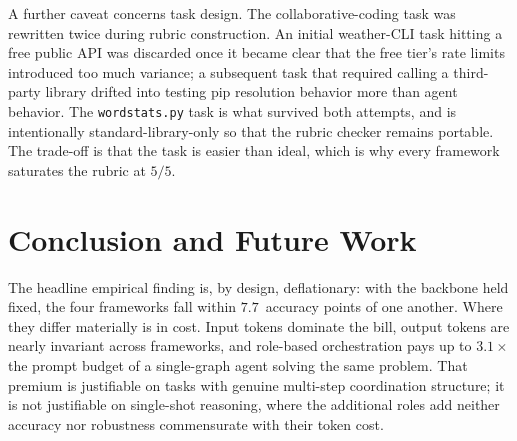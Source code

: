 \documentclass[conference]{IEEEtran}
\begin{document}
A further caveat concerns task design. The collaborative-coding task
was rewritten twice during rubric construction. An initial weather-CLI
task hitting a free public API was discarded once it became clear
that the free tier's rate limits introduced too much variance; a
subsequent task that required calling a third-party library drifted
into testing pip resolution behavior more than agent behavior. The
\texttt{wordstats.py} task is what survived both attempts, and is
intentionally standard-library-only so that the rubric checker
remains portable. The trade-off is that the task is easier than
ideal, which is why every framework saturates the rubric at $5/5$.

\section{Conclusion and Future Work}
The headline empirical finding is, by design, deflationary: with the
backbone held fixed, the four frameworks fall within $7.7$~accuracy
points of one another. Where they differ materially is in cost.
Input tokens dominate the bill, output tokens are nearly invariant
across frameworks, and role-based orchestration pays up to
$3.1\times$ the prompt budget of a single-graph agent solving the
same problem. That premium is justifiable on tasks with genuine
multi-step coordination structure; it is not justifiable on
single-shot reasoning, where the additional roles add neither
accuracy nor robustness commensurate with their token cost.
\end{document}
